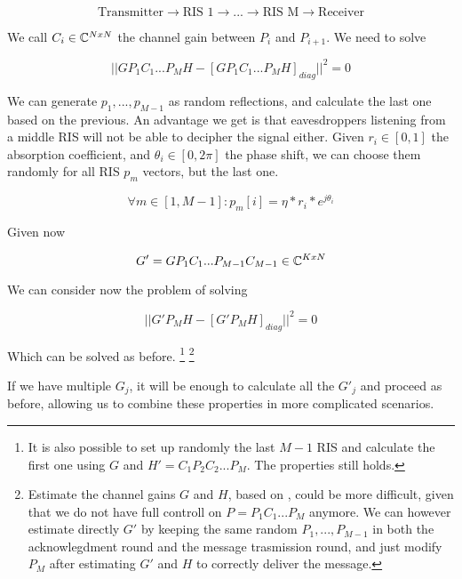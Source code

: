 \begin{equation}
  \text{Transmitter} \rightarrow \text{RIS 1} \rightarrow ... \rightarrow \text{RIS M} \rightarrow \text{Receiver}
\end{equation}

We call $C_i \in \mathbb{C}^{NxN}$ the channel gain between $P_i$ and $P_{i+1}$. We need to solve

\begin{equation}
  || GP_1C_1...P_MH - [GP_1C_1...P_MH]_{diag} || ^2 = 0
\end{equation}

We can generate $p_1, ..., p_{M-1}$ as random reflections, and calculate the last one based on the previous. An advantage we get is that eavesdroppers listening from a middle RIS will not be able to decipher the signal either. Given $r_i \in [0, 1]$ the absorption coefficient, and $\theta_i \in [0, 2\pi]$ the phase shift, we can choose them randomly for all RIS $p_m$ vectors, but the last one.

\begin{equation}
  \forall m \in [1, M-1] : p_m[i] = \eta * r_i * e^{j\theta_i}
\end{equation}

Given now

\begin{equation}
  G' = GP_1C_1...P_{M-1}C_{M-1} \in \mathbb{C}^{KxN}
\end{equation}

We can consider now the problem of solving

\begin{equation}
  || G'P_MH - [G'P_MH]_{diag} || ^2 = 0
\end{equation}

Which can be solved as before.
\footnote{It is also possible to set up randomly the last $M-1$ RIS and calculate the first one using $G$ and $H'=C_1P_2C_2...P_M$. The properties still holds.}
\footnote{Estimate the channel gains $G$ and $H$, based on \cite{8879620}, could be more difficult, given that we do not have full controll on $P=P_1C_1...P_M$ anymore. We can however estimate directly $G'$ by keeping the same random $P_1, ..., P_{M-1}$ in both the acknowlegdment round and the message trasmission round, and just modify $P_M$ after estimating $G'$ and $H$ to correctly deliver the message.}

If we have multiple $G_j$, it will be enough to calculate all the $G'_j$ and proceed as before, allowing us to combine these properties in more complicated scenarios.
